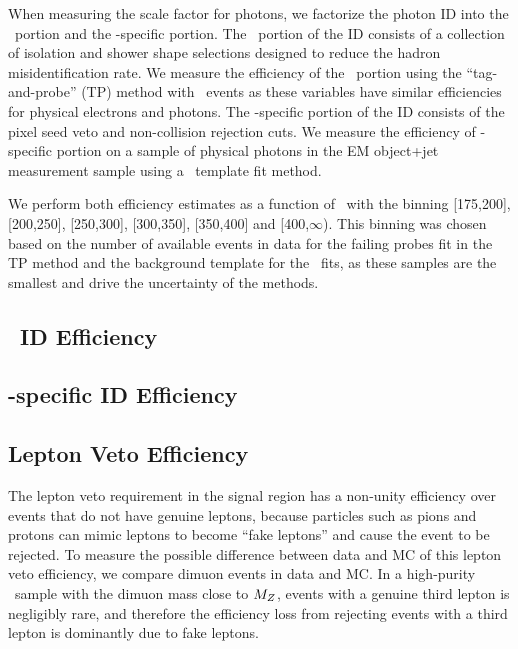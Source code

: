 When measuring the scale factor for photons, we factorize the photon ID into the \egamma\ portion and the \Pgg-specific portion. 
The \egamma\ portion of the ID consists of a collection of isolation and shower shape selections designed to reduce the hadron misidentification rate.
We measure the efficiency of the \egamma\ portion  using the ``tag-and-probe'' (TP) method with \Zee\ events as these variables have similar efficiencies for physical electrons and photons. 
The \Pgg-specific portion of the ID consists of the pixel seed veto and non-collision rejection cuts.
We measure the efficiency of \Pgg-specific portion on a sample of physical photons in the EM object+jet measurement sample using a \sieie\ template fit method.

We perform both efficiency estimates as a function of \pt\ with the binning [175,200], [200,250], [250,300], [300,350], [350,400] and [400,$\infty$). 
This binning was chosen based on the number of available events in data for the failing probes fit in the TP method and the background template for the \sieie\ fits, as these samples are the smallest and drive the uncertainty of the methods.

\subsection{\egamma\ ID Efficiency}
\label{sec:idsf}



\subsection{\Pgg-specific ID Efficiency}
\label{sec:pvsf}



\subsection{Lepton Veto Efficiency}
\label{sec:lepton_veto}

The lepton veto requirement in the signal region has a non-unity efficiency over events that do not have genuine leptons, because particles such as pions and protons can mimic leptons to become ``fake leptons'' and cause the event to be rejected. 
To measure the possible difference between data and MC of this lepton veto efficiency, we compare dimuon events in data and MC. 
In a high-purity \Zmm\  sample with the dimuon mass close to $M_{{Z}}$, events with a genuine third lepton is negligibly rare, and therefore the efficiency loss from rejecting events with a third lepton is dominantly due to fake leptons.

